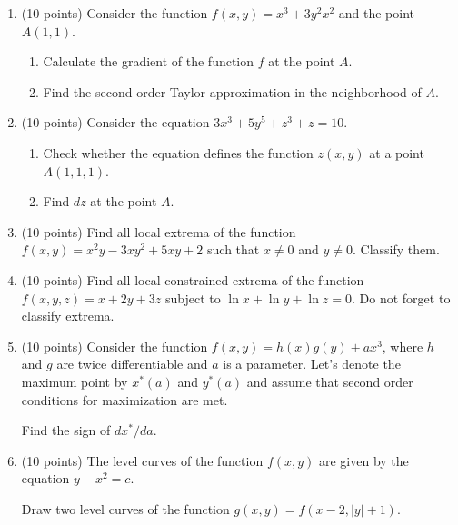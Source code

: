 \documentclass[12pt]{article} %
\theoremstyle{definition} %
\begin{document}
\begin{enumerate}

\item (10 points) Consider the function $f(x, y) = x^3 + 3y^2 x^2$ and the point $A(1,1)$.
\begin{enumerate}
  \item Calculate the gradient of the function $f$ at the point $A$.
  \item Find the second order Taylor approximation in the neighborhood of $A$.
\end{enumerate}

\item (10 points) Consider the equation $3x^3 + 5y^5 + z^3 + z=10$. 
\begin{enumerate}
  \item Check whether the equation defines the function $z(x, y)$ at a point $A(1,1,1)$.
  \item Find $dz$ at the point $A$.
\end{enumerate}


\item (10 points) Find all local extrema of the function $f(x, y) = x^2 y - 3xy^2 + 5xy +2$ such that $x\neq 0$ and $y\neq 0$. 
Classify them.

\item (10 points) Find all local constrained extrema 
of the function $f(x, y, z) = x + 2y + 3z$ subject to $\ln x + \ln y + \ln z = 0$.
Do not forget to classify extrema. 

\item (10 points) Consider the function $f(x, y) = h(x) g(y) + ax^3$, where $h$ and $g$ are twice differentiable
and $a$ is a parameter. Let's denote the maximum point by $x^*(a)$ and $y^*(a)$ and assume that second order conditions for maximization are met.

Find the sign of $dx^*/da$. 

\item (10 points) The level curves of the function $f(x,y)$ are given by the equation $y - x^2 = c$.

Draw two level curves of the function $g(x,y)=f(x-2, |y| + 1)$.

\end{enumerate}



\newpage
{}
\end{document}
